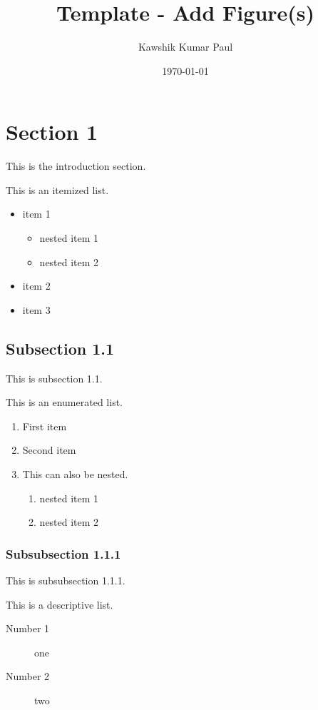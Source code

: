 \documentclass[14pt, a4paper]{article} %
\title{Template - Add Figure(s)}
\author{Kawshik Kumar Paul}
\date{\today}
\begin{document}
\maketitle
\tableofcontents %
\pagebreak %

\section{Section 1}
\label{sec:intro} %
This is the introduction section.

This is an itemized list.
\begin{itemize}
    \item item 1
    \begin{itemize}
        \item nested item 1
        \item nested item 2
    \end{itemize}
    \item item 2
    \item item 3
\end{itemize}

\subsection{Subsection 1.1}
\label{subsec:1.1} %
This is subsection 1.1.

This is an enumerated list.
\begin{enumerate}
    \item First item
    \item Second item
    \item This can also be nested.
    \begin{enumerate}
        \item nested item 1
        \item nested item 2
    \end{enumerate}
\end{enumerate}

\subsubsection{Subsubsection 1.1.1}
This is subsubsection 1.1.1.

This is a descriptive list.
\begin{description}
\item[Number 1] one
\item[Number 2] two
\end{description}
\end{document}
